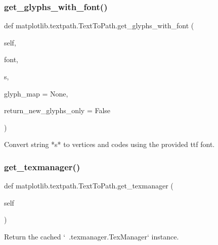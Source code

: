 \subsubsection{\texorpdfstring{get\+\_\+glyphs\+\_\+with\+\_\+font()}{get\_glyphs\_with\_font()}}
{\footnotesize\ttfamily def matplotlib.\+textpath.\+Text\+To\+Path.\+get\+\_\+glyphs\+\_\+with\+\_\+font (\begin{DoxyParamCaption}\item[{}]{self,  }\item[{}]{font,  }\item[{}]{s,  }\item[{}]{glyph\+\_\+map = {\ttfamily None},  }\item[{}]{return\+\_\+new\+\_\+glyphs\+\_\+only = {\ttfamily False} }\end{DoxyParamCaption})}

\begin{DoxyVerb}Convert string *s* to vertices and codes using the provided ttf font.
\end{DoxyVerb}
 \mbox{\label{classmatplotlib_1_1textpath_1_1TextToPath_a7ed67143c6f1f42106fc5c29adf4b8a7}} 
\subsubsection{\texorpdfstring{get\+\_\+texmanager()}{get\_texmanager()}}
{\footnotesize\ttfamily def matplotlib.\+textpath.\+Text\+To\+Path.\+get\+\_\+texmanager (\begin{DoxyParamCaption}\item[{}]{self }\end{DoxyParamCaption})}

\begin{DoxyVerb}Return the cached `~.texmanager.TexManager` instance.\end{DoxyVerb}
 \mbox{\label{classmatplotlib_1_1textpath_1_1TextToPath_a3a70c03f1989796c5656f19ad99bf2bb}} 
